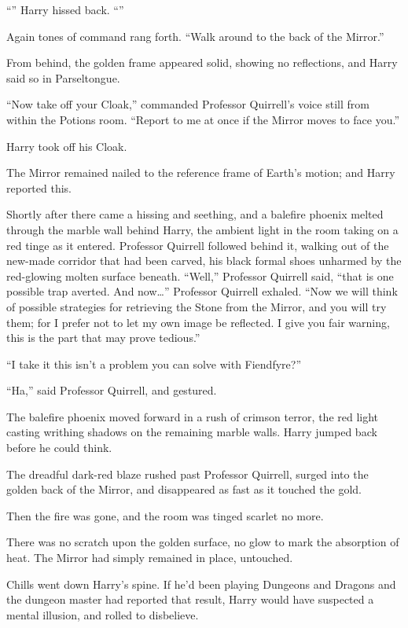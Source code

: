 “” Harry hissed back. “”

Again tones of command rang forth. “Walk around to the back of the Mirror.”

From behind, the golden frame appeared solid, showing no reflections, and Harry said so in Parseltongue.

“Now take off your Cloak,” commanded Professor Quirrell’s voice still from within the Potions room. “Report to me at once if the Mirror moves to face you.”

Harry took off his Cloak.

The Mirror remained nailed to the reference frame of Earth’s motion; and Harry reported this.

Shortly after there came a hissing and seething, and a balefire phoenix melted through the marble wall behind Harry, the ambient light in the room taking on a red tinge as it entered. Professor Quirrell followed behind it, walking out of the new-made corridor that had been carved, his black formal shoes unharmed by the red-glowing molten surface beneath. “Well,” Professor Quirrell said, “that is one possible trap averted. And now…” Professor Quirrell exhaled. “Now we will think of possible strategies for retrieving the Stone from the Mirror, and you will try them; for I prefer not to let my own image be reflected. I give you fair warning, this is the part that may prove tedious.”

“I take it this isn’t a problem you can solve with Fiendfyre?”

“Ha,” said Professor Quirrell, and gestured.

The balefire phoenix moved forward in a rush of crimson terror, the red light casting writhing shadows on the remaining marble walls. Harry jumped back before he could think.

The dreadful dark-red blaze rushed past Professor Quirrell, surged into the golden back of the Mirror, and disappeared as fast as it touched the gold.

Then the fire was gone, and the room was tinged scarlet no more.

There was no scratch upon the golden surface, no glow to mark the absorption of heat. The Mirror had simply remained in place, untouched.

Chills went down Harry’s spine. If he’d been playing Dungeons and Dragons and the dungeon master had reported that result, Harry would have suspected a mental illusion, and rolled to disbelieve.

